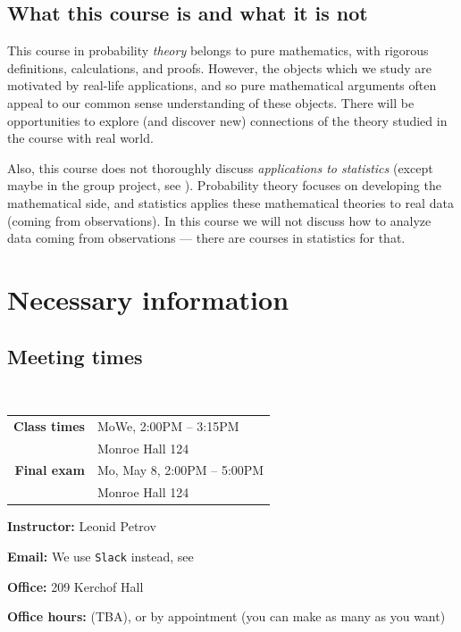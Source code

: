 \documentclass[oneside,11pt]{amsart}
\newcommand{\note}[1]{{\sf{}\color{blue}(#1)}}
\begin{document}
\subsection*{What this course is and what it is not}

This course in probability \emph{theory} belongs to pure mathematics, with
rigorous definitions, calculations, and proofs. However, the objects which we
study are motivated by real-life applications, and so pure mathematical
arguments often appeal to our common sense understanding of these objects.
There will be opportunities to explore (and discover new) connections of the
theory studied in the course with real world.

Also, this course does not thoroughly discuss \emph{applications to statistics}
(except maybe in the group project, see ).  Probability
theory focuses on developing the mathematical side, and statistics applies
these mathematical theories to real data (coming from observations). In this
course we will not discuss how to analyze data coming from observations ---
there are courses in statistics for that.

\section{Necessary information}

\subsection{Meeting times}{\ }\\

\begin{tabular}{|r|l|}
	\hline
	\textbf{Class times}  & MoWe, 2:00PM -- 3:15PM
                       \\  & Monroe Hall 124
                       \\ \hline
	\textbf{Final exam}   & Mo, May 8, 2:00PM -- 5:00PM
                       \\  & Monroe Hall 124
                       \\ \hline
\end{tabular}
\hspace{10pt}\parbox{.45\textwidth}
{

	\textbf{Instructor:} Leonid Petrov

	\textbf{Email:} We use \texttt{Slack} instead, see 

	\textbf{Office:} 209 Kerchof Hall

	\textbf{Office hours:} \note{TBA},
	or by appointment (you can make as many as you want)
}
\end{document}
